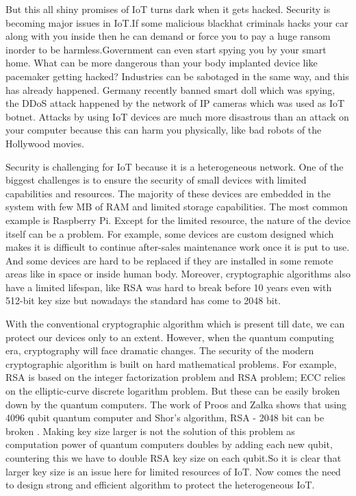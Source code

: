 \documentclass[preprint,10pt,5p]{elsarticle}
\begin{document}
But this all shiny promises of IoT turns dark when it gets hacked. Security is becoming major issues in IoT.If some malicious blackhat criminals hacks your car along with you inside then he can demand or force you to pay a huge ransom inorder to be harmless.Government can even start spying you by your smart home. What can be more dangerous than your body implanted device like pacemaker getting hacked? Industries can be sabotaged in the same way, and this has already happened. Germany recently banned smart doll which was spying, the DDoS attack happened by the network of IP cameras which was used as IoT botnet. Attacks by using IoT devices are much more disastrous than an attack on your computer because this can harm you physically, like bad robots of the Hollywood movies.

Security is challenging for IoT because it is a heterogeneous network. One of the biggest challenges is to ensure the security of small devices with limited capabilities and resources. The majority of these devices are embedded in the system with few MB of RAM and limited storage capabilities. The most common example is Raspberry Pi. Except for the limited resource, the nature of the device itself can be a problem. For example, some devices are custom designed which makes it is difficult to continue after-sales maintenance work once it is put to use. And some devices are hard to be replaced if they are installed in some remote areas like in space or inside human body. Moreover, cryptographic algorithms also have a limited lifespan, like RSA was hard to break before 10 years even with 512-bit key size but nowadays the standard has come to 2048 bit. 

With the conventional cryptographic algorithm which is present till date, we can protect our devices only to an extent. However, when the quantum computing era, cryptography will face dramatic changes. The security of the modern cryptographic algorithm is built on hard mathematical problems. For example, RSA is based on the integer factorization problem and RSA problem; ECC relies on the elliptic-curve discrete logarithm problem. But these can be easily broken down by the quantum computers. The work of Proos and Zalka shows that using 4096 qubit quantum computer and Shor's algorithm, RSA - 2048 bit can be broken \cite{Beckman1996}. Making key size larger is not the solution of this problem as computation power of quantum computers doubles by adding each new qubit, countering this we have to double RSA key size on each qubit.So it is clear that larger key size is an issue here for limited resources of IoT. Now comes the need to design strong and efficient algorithm to protect the heterogeneous IoT. 
\end{document}
